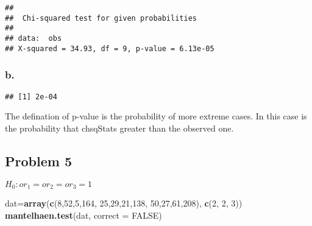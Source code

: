 \documentclass[]{article}
\newenvironment{Shaded}{\begin{snugshade}}{\end{snugshade}}
\newcommand{\KeywordTok}[1]{\textcolor[rgb]{0.13,0.29,0.53}{\textbf{#1}}}
\newcommand{\DataTypeTok}[1]{\textcolor[rgb]{0.13,0.29,0.53}{#1}}
\newcommand{\DecValTok}[1]{\textcolor[rgb]{0.00,0.00,0.81}{#1}}
\newcommand{\StringTok}[1]{\textcolor[rgb]{0.31,0.60,0.02}{#1}}
\newcommand{\OtherTok}[1]{\textcolor[rgb]{0.56,0.35,0.01}{#1}}
\newcommand{\ControlFlowTok}[1]{\textcolor[rgb]{0.13,0.29,0.53}{\textbf{#1}}}
\newcommand{\OperatorTok}[1]{\textcolor[rgb]{0.81,0.36,0.00}{\textbf{#1}}}
\newcommand{\NormalTok}[1]{#1}
\begin{document}
\begin{verbatim}
## 
##  Chi-squared test for given probabilities
## 
## data:  obs
## X-squared = 34.93, df = 9, p-value = 6.13e-05
\end{verbatim}

\subsubsection{b.}\label{b.-2}

\begin{Shaded}
\end{Shaded}

\begin{verbatim}
## [1] 2e-04
\end{verbatim}

The defination of p-value is the probability of more extreme cases. In
this case is the probability that chsqStats greater than the observed
one.

\subsection{Problem 5}\label{problem-5}

\(H_0: or_1=or_2=or_3=1\)

\begin{Shaded}
\begin{Highlighting}[]
\NormalTok{dat=}\KeywordTok{array}\NormalTok{(}\KeywordTok{c}\NormalTok{(}\DecValTok{8}\NormalTok{,}\DecValTok{52}\NormalTok{,}\DecValTok{5}\NormalTok{,}\DecValTok{164}\NormalTok{,}
            \DecValTok{25}\NormalTok{,}\DecValTok{29}\NormalTok{,}\DecValTok{21}\NormalTok{,}\DecValTok{138}\NormalTok{,}
            \DecValTok{50}\NormalTok{,}\DecValTok{27}\NormalTok{,}\DecValTok{61}\NormalTok{,}\DecValTok{208}\NormalTok{),}
\KeywordTok{c}\NormalTok{(}\DecValTok{2}\NormalTok{, }\DecValTok{2}\NormalTok{, }\DecValTok{3}\NormalTok{))}
\KeywordTok{mantelhaen.test}\NormalTok{(dat, }\DataTypeTok{correct =} \OtherTok{FALSE}\NormalTok{)}
\end{Highlighting}
\end{Shaded}
\end{document}
